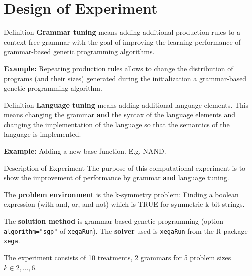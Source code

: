 \documentclass[18pt,c]{beamer}
\begin{document}
\section{Design of Experiment}
\begin{frame}
\vspace*{2mm}
\begin{block}{
Definition
}
{\bf Grammar tuning} means adding additional production rules
to a context-free grammar with the goal of improving the learning
performance of grammar-based genetic programming algorithms.
 
{\bf Example:} Repeating production rules allows to change the distribution
of programs (and their sizes) generated during the initialization a grammar-based
genetic programming algorithm.
\end{block}
\end{frame}%
\begin{frame}
\vspace*{2mm}
\begin{block}{
Definition
}
{\bf Language tuning} means adding additional language elements.
This means changing the grammar {\bf and} the syntax of the language elements
and changing the implementation of the language so that the semantics
of the language is implemented.
 
{\bf Example:} Adding a new base function. E.g. NAND.
\end{block}
\end{frame}%
\begin{frame}
\vspace*{2mm}
\begin{block}{
Description of Experiment
}
The purpose of this computational experiment is to show the improvement
of performance by grammar {\bf and} language tuning.
 
The {\bf problem environment} is the k-symmetry problem: 
Finding a boolean expression (with and, or, and not)
which is TRUE for symmetric k-bit strings.
 
The {\bf solution method} is grammar-based genetic programming
(option {\tt algorithm="sgp"}  of {\tt xegaRun}).
The {\bf solver} used is {\tt xegaRun} from the R-package {\tt xega}.
 
The experiment consists of 10 treatments, 2 grammars for 5 problem sizes $k\in 2,\dots, 6$.
\end{block}
\end{frame}%
\end{document}

